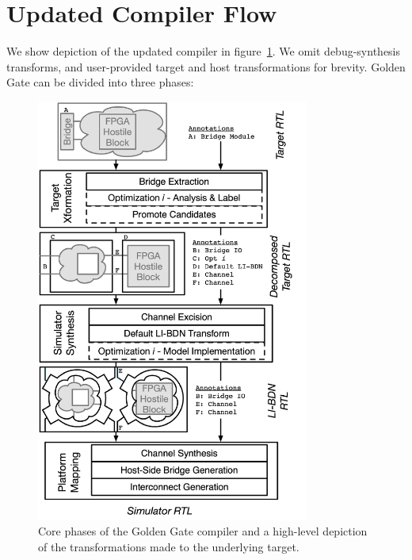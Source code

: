 \section{Updated Compiler Flow}


We show depiction of the updated compiler in figure~\ref{fig:gg-toolchain}. We
omit debug-synthesis transforms, and user-provided target and host
transformations for brevity. Golden Gate can be divided into three phases:

\begin{figure}
    \centering
    \includegraphics[width=0.8\textwidth]{figures/gg-toolchain.pdf}
    \caption{Core phases of the Golden Gate compiler and a high-level depiction of the transformations made to the underlying target.}
    \label{fig:gg-toolchain}
\end{figure}

